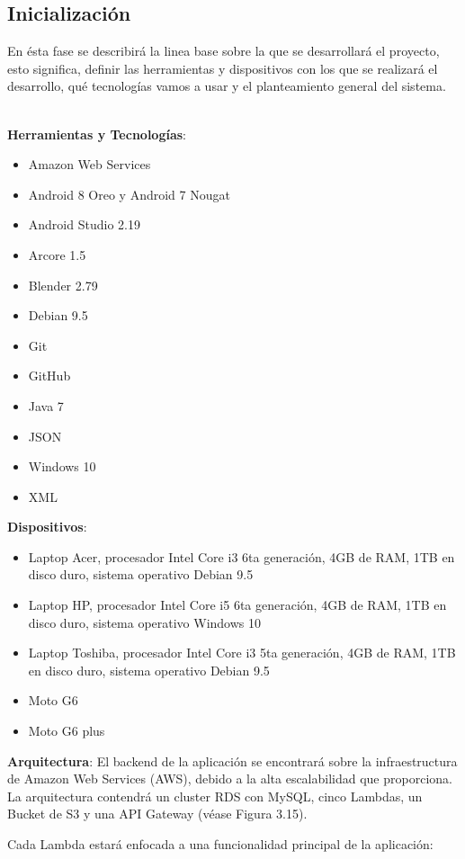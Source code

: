 \subsection{Inicialización}
En ésta fase se describirá la linea base sobre la que se desarrollará el proyecto, esto significa, definir las herramientas y dispositivos con los que se realizará el desarrollo, qué tecnologías vamos a usar y el planteamiento general del sistema.\par
\noindent
\\
\textbf{Herramientas y Tecnologías}:
	\begin{itemize}
			\item Amazon Web Services
			\item Android 8 Oreo y Android 7 Nougat
			\item Android Studio 2.19
			\item Arcore 1.5
			\item Blender 2.79
			\item Debian  9.5
			\item Git
			\item GitHub
			\item Java 7
	  		\item JSON
			\item Windows 10
			\item XML		
	\end{itemize}
	\noindent
\textbf{Dispositivos}:
\begin{itemize}
	\item Laptop Acer, procesador Intel Core i3 6ta generación, 4GB de RAM, 1TB en disco duro, sistema operativo Debian  9.5
	\item Laptop HP, procesador Intel Core i5 6ta generación, 4GB de RAM, 1TB en disco duro, sistema operativo Windows 10
	\item Laptop Toshiba, procesador Intel Core i3 5ta generación, 4GB de RAM, 1TB en disco duro, sistema operativo Debian 9.5
	\item Moto G6
	\item Moto G6 plus		
\end{itemize}
\noindent
\textbf{Arquitectura}:
El backend de la aplicación se encontrará sobre la infraestructura de Amazon Web Services (AWS), debido a la alta escalabilidad que proporciona. La arquitectura contendrá un cluster RDS con MySQL, cinco Lambdas, un Bucket de S3 y una API Gateway (véase Figura 3.15).\par
Cada Lambda estará enfocada a una funcionalidad principal de la aplicación:\par
